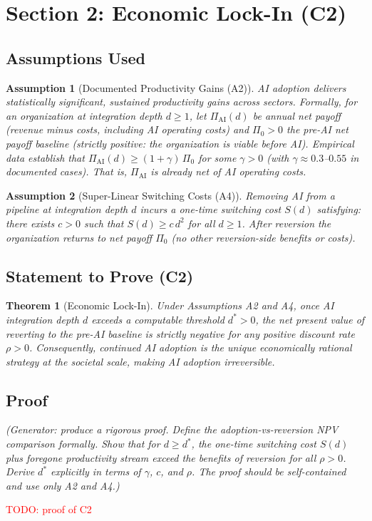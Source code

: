 \documentclass[12pt]{article}
\newtheorem{theorem}{Theorem}
\newtheorem{assumption}{Assumption}
\begin{document}
\section*{Section 2: Economic Lock-In (C2)}

\subsection*{Assumptions Used}

\begin{assumption}[Documented Productivity Gains (A2)]
  AI adoption delivers statistically significant, sustained productivity gains
  across sectors.  Formally, for an organization at integration depth $d \geq 1$,
  let $\Pi_{\mathrm{AI}}(d)$ be annual \emph{net} payoff (revenue minus costs,
  including AI operating costs) and $\Pi_0 > 0$ the pre-AI net payoff baseline
  (strictly positive: the organization is viable before AI).
  Empirical data establish that $\Pi_{\mathrm{AI}}(d) \geq (1 + \gamma)\,\Pi_0$
  for some $\gamma > 0$ (with $\gamma \approx 0.3$--$0.55$ in documented cases).
  That is, $\Pi_{\mathrm{AI}}$ is already \emph{net} of AI operating costs.
\end{assumption}

\begin{assumption}[Super-Linear Switching Costs (A4)]
  Removing AI from a pipeline at integration depth $d$ incurs a one-time
  switching cost $S(d)$ satisfying: there exists $c > 0$ such that
  $S(d) \geq c\,d^2$ for all $d \geq 1$.
  After reversion the organization returns to net payoff $\Pi_0$ (no other
  reversion-side benefits or costs).
\end{assumption}

\subsection*{Statement to Prove (C2)}

\begin{theorem}[Economic Lock-In]
  Under Assumptions A2 and A4, once AI integration depth $d$ exceeds a
  computable threshold $d^* > 0$, the net present value of reverting to the
  pre-AI baseline is strictly negative for any positive discount rate $\rho > 0$.
  Consequently, continued AI adoption is the unique economically rational
  strategy at the societal scale, making AI adoption irreversible.
\end{theorem}

\subsection*{Proof}

\textit{(Generator: produce a rigorous proof.  Define the adoption-vs-reversion
NPV comparison formally.  Show that for $d \geq d^*$, the one-time switching
cost $S(d)$ plus foregone productivity stream exceed the benefits of reversion
for all $\rho > 0$.  Derive $d^*$ explicitly in terms of $\gamma$, $c$, and $\rho$.
The proof should be self-contained and use only A2 and A4.)}

\textcolor{red}{TODO: proof of C2}
\end{document}
